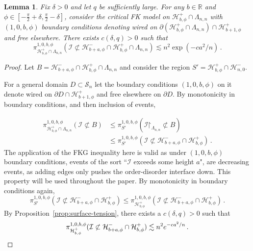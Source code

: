 \documentclass[reqno,11pt]{amsart}
\numberwithin{equation}{section}
\renewcommand{\restriction}{\mathord{\upharpoonright}}
\newtheorem{lemma}[theorem]{Lemma}
\theoremstyle{definition}{
\newtheorem{example}[theorem]{Example}
\newtheorem{definition}[theorem]{Definition}
\newtheorem*{definition*}{Definition}
\newtheorem{problem}[theorem]{Problem}
\newtheorem{question}[theorem]{Question}
\newtheorem{remark}[theorem]{Remark}
}
\begin{document}
\begin{lemma}\label{lem:subset-surface-tension}
Fix $\delta>0$ and let $q$ be sufficiently large. For any $b\in \mathbb R$ and $\phi\in [-\frac \pi 2 +\delta, \frac \pi 2 - \delta]$,  consider the critical FK model on $\mathcal H^+_{b,\phi}\cap \Lambda_{n,n}$ with $(1,0,b,\phi)$ boundary conditions denoting wired on $\partial (\mathcal H_{b,\phi}^+ \cap \Lambda_{n,n})\cap \mathcal H^+_{b+1,\phi}$ and free elsewhere. There exists $c(\delta,q)>0$ such that
\[\pi_{\mathcal H_{b,\phi}^+ \cap \Lambda_{n,n}} ^{1,0,b,\phi} (\mathcal I \not \subset \mathcal H^-_{b+a,\phi} \cap \mathcal H^+_{b,\phi}\cap \Lambda_{n,n}) \lesssim n^2 \exp({-ca^2/n})\,.
\]
\end{lemma}

\begin{proof}Let $B=\mathcal H^-_{b+a,\phi} \cap \mathcal H^+_{b,\phi}\cap \Lambda_{n,n}$ and consider the region $S'= \mathcal H^+_{b,\phi} \cap \mathcal H^-_{n,0}$.

For a general domain $D\subset \mathcal S_n$ let the boundary conditions $(1,0,b,\phi)$ on it denote wired on $\partial D\cap \mathcal H^+_{b+1,\phi}$ and free elsewhere on $\partial D$. By monotonicity in boundary conditions, and then inclusion of events,

\begin{align*}
\pi _{\mathcal H^+_{b,\phi} \cap \Lambda_{n,n}}^{1,0,b,\phi} (\mathcal I\not \subset B)
& \leq \pi^{1,0,b,\phi} _{S'}(\mathcal I\restriction_{\Lambda_{n,n}} \not \subset B) \\
& \leq \pi^{1,0,b,\phi} _{S'}(\mathcal I \not \subset \mathcal H^-_{b+a,\phi} \cap \mathcal H^+_{b,\phi})\,.
\end{align*}
The application of the FKG inequality here is valid as under $(1,0,b,\phi)$ boundary conditions, events of the sort ``$\mathcal I$ exceeds some height $a$", are decreasing events, as adding edges only pushes the order-disorder interface down. This property will be used throughout the paper. By monotonicity in boundary conditions again,
\[\pi_{S'}^{1,0,b,\phi}(\mathcal I \not \subset \mathcal H^-_{b+a,\phi}\cap \mathcal H^+_{b,\phi}) \leq
\pi_{\mathcal H^+_{b,\phi}}^{1,0,b,\phi} (\mathcal I \not \subset \mathcal H^-_{b+a,\phi}\cap \mathcal H^+_{b,\phi})\,.
\]
By Proposition~\ref{prop:surface-tension}, there exists a $c(\delta,q)>0$ such that
\[\pi_{\mathcal H^+_{b,\phi}}^{1,0,b,\phi} (\mathcal I \not \subset \mathcal H^-_{b+a,\phi}\cap \mathcal H^+_{b,\phi}) \lesssim n^2 e^{-c a^2/n}\,. \qedhere
\]
\end{proof}
\end{document}
